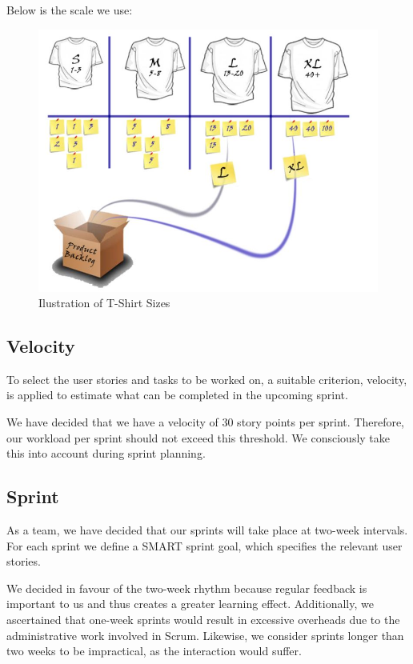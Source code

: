 Below is the scale we use:
\begin{figure}[h!]
    \centering
    \includegraphics[width=1\textwidth]{pictures/tshirt_sizes}
    \caption{Ilustration of T-Shirt Sizes}
    \label{fig:tshirt_sizes}
\end{figure}
\clearpage

\subsection{Velocity}
To select the user stories and tasks to be worked on, a suitable criterion, velocity, is applied to estimate what can be completed in the upcoming sprint.

We have decided that we have a velocity of 30 story points per sprint.
Therefore, our workload per sprint should not exceed this threshold. We consciously take this into account during sprint planning.

\subsection{Sprint}
As a team, we have decided that our sprints will take place at two-week intervals. For each sprint we define a SMART sprint goal, which specifies the relevant user stories.

We decided in favour of the two-week rhythm because regular feedback is important to us and thus creates a greater learning effect. Additionally, we ascertained that one-week sprints would result in excessive overheads due to the administrative work involved in Scrum. Likewise, we consider sprints longer than two weeks to be impractical, as the interaction would suffer.

